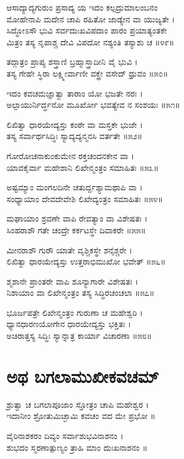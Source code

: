 ಆಸಾದ್ಯಾದ್ಯಗುರುಂ ಪ್ರಸಾದ್ಯ ಯ ಇದಂ ಕಲ್ಪದ್ರುಮಾಲಂಬನಂ\\
ಮೋಹೇನಾಪಿ ಮದೇನ ಚಾಪಿ ರಹಿತೋ ಜಾಡ್ಯೇನ ವಾ ಯುಜ್ಯತೇ ।\\
ಸಿದ್ಧೋಽಸೌ ಭುವಿ ಸರ್ವದುಃಖವಿಪದಾಂ ಪಾರಂ ಪ್ರಯಾತ್ಯಂತಕೇ\\
ಮಿತ್ರಂ ತಸ್ಯ ನೃಪಾಶ್ಚ ದೇವಿ ವಿಪದೋ ನಶ್ಯಂತಿ ತಸ್ಯಾಶು ಚ ॥೪೯॥

ತದ್ಗಾತ್ರಂ ಪ್ರಾಪ್ಯ ಶಸ್ತ್ರಾಣಿ ಬ್ರಹ್ಮಾಸ್ತ್ರಾದೀನಿ ವೈ ಭುವಿ ।\\
ತಸ್ಯ ಗೇಹೇ ಸ್ಥಿರಾ ಲಕ್ಷ್ಮೀರ್ವಾಣೀ ವಕ್ತ್ರೇ ವಸೇದ್ ಧ್ರುವಂ ॥೫೦॥

ಇದಂ ಕವಚಮಜ್ಞಾತ್ವಾ ತಾರಾಂ ಯೋ ಭಜತೇ ನರಃ ।\\
ಅಲ್ಪಾಯುರ್ನಿರ್ದ್ಧನೋ ಮೂರ್ಖೋ ಭವತ್ಯೇವ ನ ಸಂಶಯಃ ॥೫೧॥

ಲಿಖಿತ್ವಾ ಧಾರಯೇದ್ಯಸ್ತು ಕಂಠೇ ವಾ ಮಸ್ತಕೇ ಭುಜೇ ।\\
ತಸ್ಯ ಸರ್ವಾರ್ಥಸಿದ್ಧಿಃ ಸ್ಯಾದ್ಯದ್ಯನ್ಮನಸಿ ವರ್ತತೇ ॥೫೨॥

ಗೋರೋಚನಾಕುಂಕುಮೇನ ರಕ್ತಚಂದನಕೇನ ವಾ ।\\
ಯಾವಕೈರ್ವಾ ಮಹೇಶಾನಿ ಲಿಖೇನ್ಮಂತ್ರಂ ಸಮಾಹಿತಃ ॥೫೩॥

ಅಷ್ಟಮ್ಯಾಂ ಮಂಗಲದಿನೇ ಚತುರ್ದ್ದಶ್ಯಾಮಥಾಪಿ ವಾ ।\\
ಸಂಧ್ಯಾಯಾಂ ದೇವದೇವೇಶಿ ಲಿಖೇದ್ಯಂತ್ರಂ ಸಮಾಹಿತಃ ॥೫೪॥

ಮಘಾಯಾಂ ಶ್ರವಣೇ ವಾಪಿ ರೇವತ್ಯಾಂ ವಾ ವಿಶೇಷತಃ ।\\
ಸಿಂಹರಾಶೌ ಗತೇ ಚಂದ್ರೇ ಕರ್ಕಟಸ್ಥೇ ದಿವಾಕರೇ ॥೫೫॥

ಮೀನರಾಶೌ ಗುರೌ ಯಾತೇ ವೃಶ್ಚಿಕಸ್ಥೇ ಶನೈಶ್ಚರೇ ।\\
ಲಿಖಿತ್ವಾ ಧಾರಯೇದ್ಯಸ್ತು ಉತ್ತರಾಭಿಮುಖೋ ಭವೇತ್ ॥೫೬॥

ಶ್ಮಶಾನೇ ಪ್ರಾಂತರೇ ವಾಪಿ ಶೂನ್ಯಾಗಾರೇ ವಿಶೇಷತಃ ।\\
ನಿಶಾಯಾಂ ವಾ ಲಿಖೇನ್ಮಂತ್ರಂ ತಸ್ಯ ಸಿದ್ಧಿರಚಂಚಲಾ ॥೫೭॥

ಭೂರ್ಜಪತ್ರೇ ಲಿಖೇನ್ಮಂತ್ರಂ ಗುರುಣಾ ಚ ಮಹೇಶ್ವರಿ ।\\
ಧ್ಯಾನಧಾರಣಯೋಗೇನ ಧಾರಯೇದ್ಯಸ್ತು ಭಕ್ತಿತಃ ।\\
ಅಚಿರಾತ್ತಸ್ಯ ಸಿದ್ಧಿಃ ಸ್ಯಾನ್ನಾತ್ರ ಕಾರ್ಯಾ ವಿಚಾರಣಾ ॥೫೮॥
\section{ಅಥ ಬಗಲಾಮುಖೀಕವಚಮ್}
ಶ್ರುತ್ವಾ ಚ ಬಗಲಾಪೂಜಾಂ ಸ್ತೋತ್ರಂ ಚಾಪಿ ಮಹೇಶ್ವರ ।\\
ಇದಾನೀಂ ಶ್ರೋತುಮಿಚ್ಛಾಮಿ ಕವಚಂ ವದ ಮೇ ಪ್ರಭೋ ॥

ವೈರಿನಾಶಕರಂ ದಿವ್ಯಂ ಸರ್ವಾಶುಭವಿನಾಶನಂ ।\\
ಶುಭದಂ ಸ್ಮರಣಾತ್ಪುಣ್ಯಂ ತ್ರಾಹಿ ಮಾಂ ದುಃಖನಾಶನಂ ॥

